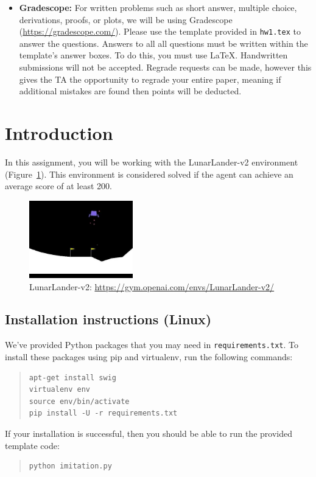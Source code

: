 \documentclass[12pt]{article}
\begin{document}
\begin{itemize}
\begin{itemize}
\item \textbf{Gradescope:} For written problems such as short answer, multiple choice, derivations, proofs, or plots, we will be using Gradescope (\url{https://gradescope.com/}). Please use the template provided in \texttt{hw1.tex} to answer the questions.  Answers to all all questions must be written within the template's answer boxes. To do this, you must use LaTeX.  Handwritten submissions will not be accepted. Regrade requests can be made, however this gives the TA the opportunity to regrade your entire paper, meaning if additional mistakes are found then points will be deducted.

\end{itemize}
\end{itemize}

\newpage

\section*{Introduction}

In this assignment, you will be working with the LunarLander-v2 environment (Figure~\ref{fig:lunarlander-v2}). This environment is considered solved if the agent can achieve an average score of at least 200.

\begin{center}
\begin{figure}[h]\centering
\includegraphics[width=0.4\textwidth]{lunarlander.jpg}
\caption{LunarLander-v2: \url{https://gym.openai.com/envs/LunarLander-v2/} \label{fig:lunarlander-v2}}
\end{figure}
\end{center}

\subsection*{Installation instructions (Linux)}

We've provided Python packages that you may need in \texttt{requirements.txt}. To install these packages using pip and virtualenv, run the following commands:
\begin{quote}
\begin{verbatim}
apt-get install swig
virtualenv env
source env/bin/activate
pip install -U -r requirements.txt
\end{verbatim}
\end{quote}
If your installation is successful, then you should be able to run the provided template code:
\begin{quote}
\begin{verbatim}
python imitation.py
\end{verbatim}
\end{quote}
\end{document}
